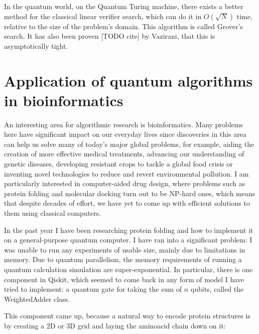 In the quantum world, on the Quantum Turing machine, there exists a better method for the classical linear verifier search, which can do it in $O(\sqrt{N})$ time, relative to the size of the problem's domain. This algorithm is called Grover's search. It has also been proven [TODO cite] by Vazirani, that this is asymptotically tight.

\section{Application of quantum algorithms in bioinformatics}

An interesting area for algorithmic research is bioinformatics. Many problems here have significant impact on our everyday lives since discoveries in this area can help us solve many of today’s major global problems, for example, aiding the creation of more effective medical treatments, advancing our understanding of genetic diseases, developing resistant crops to tackle a global food crisis or inventing novel technologies to reduce and revert environmental pollution. I am particularly interested in computer-aided drug design, where problems such as protein folding and molecular docking turn out to be NP-hard ones, which means that despite decades of effort, we have yet to come up with efficient solutions to them using classical computers.

In the past year I have been researching protein folding and how to implement it on a general-purpose quantum computer. I have ran into a significant problem: I was unable to run any experiments of usable size, mainly due to limitations in memory. Due to quantum parallelism, the memory requirements of running a quantum calculation simulation are super-exponential. In particular, there is one component in Qiskit, which seemed to come back in any form of model I have tried to implement: a quantum gate for taking the sum of $n$ qubits, called the WeightedAdder class. 

This component came up, because a natural way to encode protein structures is by creating a 2D or 3D grid and laying the aminoacid chain down on it:

